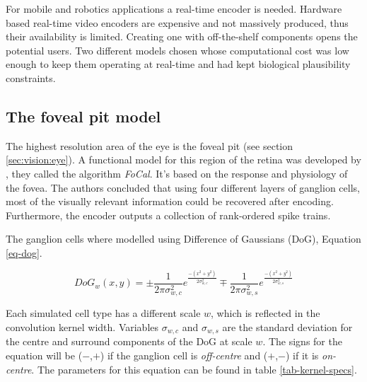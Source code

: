 For mobile and robotics applications a real-time encoder is needed. Hardware based real-time video encoders are expensive and not massively produced, thus their availability is limited. Creating one with off-the-shelf components opens the potential users. Two different models chosen whose computational cost was low enough to keep them operating at real-time and had kept biological plausibility constraints.


\subsection{The foveal pit model}

The highest resolution area of the eye is the foveal pit (see section \ref{sec:vision:eye}). A functional model for this region of the retina was developed by \citeauthor{basab-model}, they called the algorithm \emph{FoCal}\cite{basab-model}. It's based on the response and physiology of the fovea. The authors concluded that using four different layers of ganglion cells, most of the visually relevant information could be recovered after encoding. Furthermore, the encoder outputs a collection of rank-ordered spike trains. 

The ganglion cells where modelled using Difference of Gaussians (DoG), Equation \ref{eq-dog}. 

\begin{equation}
\label{eq-dog}
DoG_w(x,y) = \pm\frac{1}{2\pi\sigma_{w,c}^2}e^{\frac{-(x^2 + y^2)}{2\sigma_{w,c}^2}}
\mp\frac{1}{2\pi\sigma_{w,s}^2}e^{\frac{-(x^2 + y^2)}{2\sigma_{w,s}^2}}
\end{equation}

Each simulated cell type has a different scale $w$, which is reflected in the convolution kernel width. Variables $\sigma_{w,c}$ and $\sigma_{w,s}$ are the standard deviation for the centre and surround components of the DoG at scale $w$.  The signs for the equation will be ($-$,$+$) if the ganglion cell is \emph{off-centre} and ($+$,$-$) if it is \emph{on-centre}. The parameters for this equation can be found in table \ref{tab-kernel-specs}.

